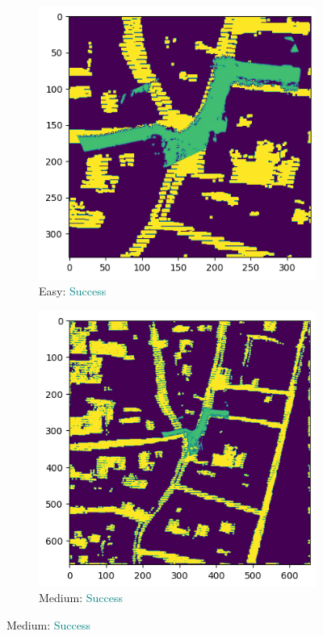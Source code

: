 \documentclass[11pt]{article}
\begin{document}
    \newpage
    \begin{figure}[p]
        \centering
        \begin{subfigure}{0.45\textwidth}
            \centering
            \includegraphics[width=\linewidth]{images/full/easy/5_7_1_easy}
            \caption{Easy: \textcolor{teal}{Success}}
            \label{fig:5_7_1_easy}
        \end{subfigure}
        \hfill
        \begin{subfigure}{0.45\textwidth}
            \centering
            \includegraphics[width=\linewidth]{images/full/medium/5_7_1_medium}
            \caption{Medium: \textcolor{teal}{Success}}
            \label{fig:5_7_1_medium}
        \end{subfigure}


\end{figure}
\end{document}
